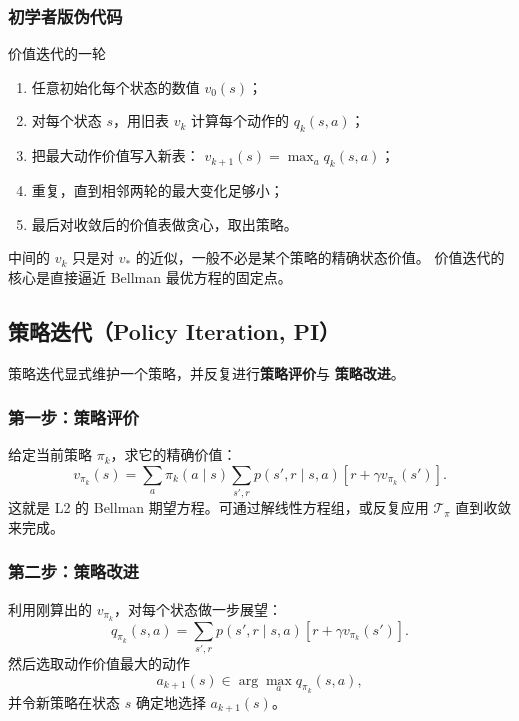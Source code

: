 \documentclass[11pt,a4paper,fontset=fandol]{ctexart}
\newcommand{\vstar}{v_*}
\newcommand{\Tpi}{\mathcal{T}_{\pi}}
\begin{document}
\subsubsection{初学者版伪代码}

\begin{goalbox}{价值迭代的一轮}
\begin{enumerate}
  \item 任意初始化每个状态的数值 \(v_0(s)\)；
  \item 对每个状态 \(s\)，用旧表 \(v_k\) 计算每个动作的 \(q_k(s,a)\)；
  \item 把最大动作价值写入新表：
  \(v_{k+1}(s)=\max_a q_k(s,a)\)；
  \item 重复，直到相邻两轮的最大变化足够小；
  \item 最后对收敛后的价值表做贪心，取出策略。
\end{enumerate}
\end{goalbox}

\begin{warningbox}
中间的 \(v_k\) 只是对 \(\vstar\) 的近似，一般不必是某个策略的精确状态价值。
价值迭代的核心是直接逼近 Bellman 最优方程的固定点。
\end{warningbox}

\subsection{策略迭代（Policy Iteration, PI）}

策略迭代显式维护一个策略，并反复进行\textbf{策略评价}与
\textbf{策略改进}。

\subsubsection{第一步：策略评价}

给定当前策略 \(\pi_k\)，求它的精确价值：
\[
\boxed{
v_{\pi_k}(s)
=
\sum_a\pi_k(a\mid s)
\sum_{s',r}p(s',r\mid s,a)
\left[r+\gamma v_{\pi_k}(s')\right]
}.
\]
这就是 L2 的 Bellman 期望方程。可通过解线性方程组，或反复应用
\(\Tpi\) 直到收敛来完成。

\subsubsection{第二步：策略改进}

利用刚算出的 \(v_{\pi_k}\)，对每个状态做一步展望：
\[
q_{\pi_k}(s,a)
=
\sum_{s',r}p(s',r\mid s,a)
\left[r+\gamma v_{\pi_k}(s')\right].
\]
然后选取动作价值最大的动作
\[
\boxed{
a_{k+1}(s)\in\arg\max_a q_{\pi_k}(s,a)
},
\]
并令新策略在状态 \(s\) 确定地选择 \(a_{k+1}(s)\)。
\end{document}
